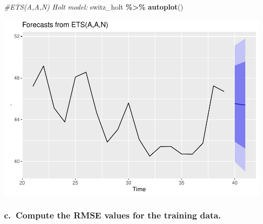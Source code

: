 \documentclass[
]{article}
\newenvironment{Shaded}{\begin{snugshade}}{\end{snugshade}}
\newcommand{\AttributeTok}[1]{\textcolor[rgb]{0.13,0.29,0.53}{#1}}
\newcommand{\CommentTok}[1]{\textcolor[rgb]{0.56,0.35,0.01}{\textit{#1}}}
\newcommand{\DecValTok}[1]{\textcolor[rgb]{0.00,0.00,0.81}{#1}}
\newcommand{\FunctionTok}[1]{\textcolor[rgb]{0.13,0.29,0.53}{\textbf{#1}}}
\newcommand{\NormalTok}[1]{#1}
\newcommand{\OtherTok}[1]{\textcolor[rgb]{0.56,0.35,0.01}{#1}}
\newcommand{\SpecialCharTok}[1]{\textcolor[rgb]{0.81,0.36,0.00}{\textbf{#1}}}
\newcommand{\StringTok}[1]{\textcolor[rgb]{0.31,0.60,0.02}{#1}}
\begin{document}
\begin{Shaded}
\begin{Highlighting}[]
\CommentTok{\#ETS(A,A,N) Holt model:}
\NormalTok{switz\_holt }\SpecialCharTok{\%\textgreater{}\%} \FunctionTok{autoplot}\NormalTok{()}
\end{Highlighting}
\end{Shaded}

\includegraphics{MontgomeryR_Assignment3_files/figure-latex/unnamed-chunk-4-1.pdf}

\hypertarget{c.-compute-the-rmse-values-for-the-training-data.}{%
\subsubsection{c.~Compute the RMSE values for the training
data.}\label{c.-compute-the-rmse-values-for-the-training-data.}}

\begin{Shaded}
\end{Shaded}
\end{document}
